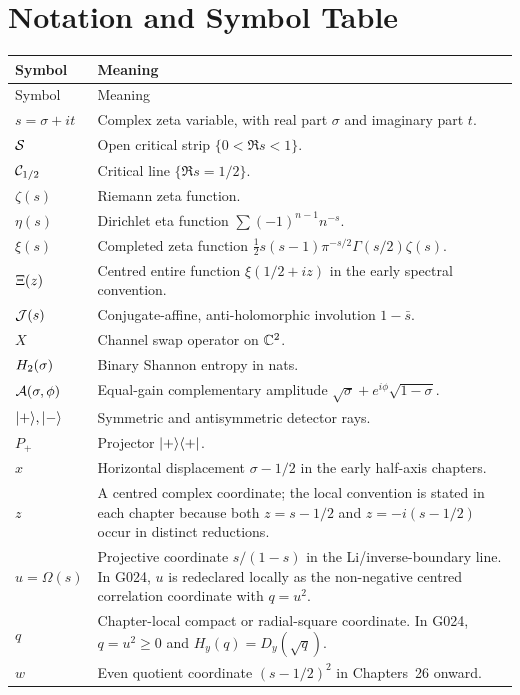 \chapter{Notation and Symbol Table}
\label{app:notation}

\begin{longtable}{p{}p{}}
\toprule
Symbol & Meaning\\
\midrule
\endfirsthead
\toprule
Symbol & Meaning\\
\midrule
\endhead
$s=\sigma+it$ & Complex zeta variable, with real part $\sigma$ and imaginary part $t$.\\
$\mathcal{S}$ & Open critical strip $\{0<\Re s<1\}$.\\
$\mathcal{C}_{1/2}$ & Critical line $\{\Re s=1/2\}$.\\
$\zeta(s)$ & Riemann zeta function.\\
$\eta(s)$ & Dirichlet eta function $\sum(-1)^{n-1}n^{-s}$.\\
$\xi(s)$ & Completed zeta function $\frac12s(s-1)\pi^{-s/2}\Gamma(s/2)\zeta(s)$.\\
$\Xi(z)$ & Centred entire function $\xi(1/2+iz)$ in the early spectral convention.\\
$\mathcal{J}(s)$ & Conjugate-affine, anti-holomorphic involution $1-\bar s$.\\
$X$ & Channel swap operator on $\mathbb{C}^2$.\\
$H_2(\sigma)$ & Binary Shannon entropy in nats.\\
$\mathcal{A}(\sigma,\phi)$ & Equal-gain complementary amplitude $\sqrt\sigma+e^{i\phi}\sqrt{1-\sigma}$.\\
$\lvert +\rangle,\lvert -\rangle$ & Symmetric and antisymmetric detector rays.\\
$P_+$ & Projector $\lvert +\rangle\langle +\rvert$.\\
$x$ & Horizontal displacement $\sigma-1/2$ in the early half-axis chapters.\\
$z$ & A centred complex coordinate; the local convention is stated in each chapter because both $z=s-1/2$ and $z=-i(s-1/2)$ occur in distinct reductions.\\
$u=\Omega(s)$ & Projective coordinate $s/(1-s)$ in the Li/inverse-boundary line. In G024, $u$ is redeclared locally as the non-negative centred correlation coordinate with $q=u^2$.\\
$q$ & Chapter-local compact or radial-square coordinate. In G024, $q=u^2\ge0$ and $H_y(q)=D_y(\sqrt q)$.\\
$w$ & Even quotient coordinate $(s-1/2)^2$ in Chapters~26 onward.\\

\end{longtable}
